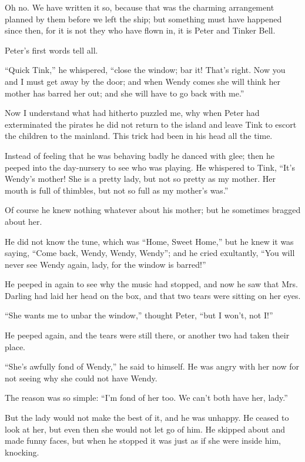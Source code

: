 Oh no. We have written it so, because that was the charming arrangement
planned by them before we left the ship; but something must have
happened since then, for it is not they who have flown in, it is Peter
and Tinker Bell.

Peter's first words tell all.

``Quick Tink,'' he whispered, ``close the window; bar it! That's right.
Now you and I must get away by the door; and when Wendy comes she will
think her mother has barred her out; and she will have to go back with
me.''

Now I understand what had hitherto puzzled me, why when Peter had
exterminated the pirates he did not return to the island and leave Tink
to escort the children to the mainland. This trick had been in his head
all the time.

Instead of feeling that he was behaving badly he danced with glee; then
he peeped into the day-nursery to see who was playing. He whispered to
Tink, ``It's Wendy's mother! She is a pretty lady, but not so pretty as
my mother. Her mouth is full of thimbles, but not so full as my
mother's was.''

Of course he knew nothing whatever about his mother; but he sometimes
bragged about her.

He did not know the tune, which was ``Home, Sweet Home,'' but he knew it
was saying, ``Come back, Wendy, Wendy, Wendy''; and he cried exultantly,
``You will never see Wendy again, lady, for the window is barred!''

He peeped in again to see why the music had stopped, and now he saw
that Mrs. Darling had laid her head on the box, and that two tears were
sitting on her eyes.

``She wants me to unbar the window,'' thought Peter, ``but I won't, not
I!''

He peeped again, and the tears were still there, or another two had
taken their place.

``She's awfully fond of Wendy,'' he said to himself. He was angry with
her now for not seeing why she could not have Wendy.

The reason was so simple: ``I'm fond of her too. We can't both have her,
lady.''

But the lady would not make the best of it, and he was unhappy. He
ceased to look at her, but even then she would not let go of him. He
skipped about and made funny faces, but when he stopped it was just as
if she were inside him, knocking.

